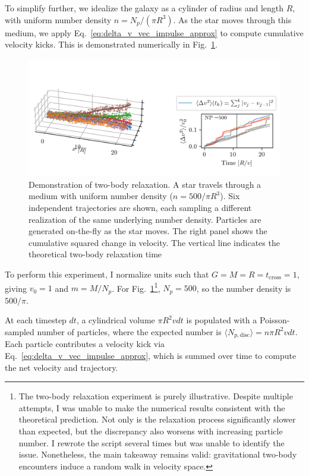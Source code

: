             To simplify further, we idealize the galaxy as a cylinder of radius and length $R$, with uniform number density $n = N_p / (\pi R^3)$. As the star moves through this medium, we apply Eq.~\ref{eq:delta_v_vec_impulse_approx} to compute cumulative velocity kicks. This is demonstrated numerically in Fig.~\ref{fig:twoBodyRelaxation}.

            \begin{figure}
                \includegraphics[]{images/twoBodyRelaxation.png}
                \caption{Demonstration of two-body relaxation. A star travels through a medium with uniform number density ($n = 500/\pi R^3$). Six independent trajectories are shown, each sampling a different realization of the same underlying number density. Particles are generated on-the-fly as the star moves. The right panel shows the cumulative squared change in velocity. The vertical line indicates the theoretical two-body relaxation time}
                \label{fig:twoBodyRelaxation}
            \end{figure}

            To perform this experiment, I normalize units such that $G = M = R = t_\mathrm{cross} = 1$, giving $v_0 = 1$ and $m = M/N_p$. For Fig.~\ref{fig:twoBodyRelaxation}\footnote{The two-body relaxation experiment is purely illustrative. Despite multiple attempts, I was unable to make the numerical results consistent with the theoretical prediction. Not only is the relaxation process significantly slower than expected, but the discrepancy also worsens with increasing particle number. I rewrote the script several times but was unable to identify the issue. Nonetheless, the main takeaway remains valid: gravitational two-body encounters induce a random walk in velocity space.}, $N_p = 500$, so the number density is $500/\pi$. 

            At each timestep $dt$, a cylindrical volume $\pi R^2 v dt$ is populated with a Poisson-sampled number of particles, where the expected number is $\langle N_{p,\mathrm{disc}} \rangle = n \pi R^2 v dt$. Each particle contributes a velocity kick via Eq.~\ref{eq:delta_v_vec_impulse_approx}, which is summed over time to compute the net velocity and trajectory.


